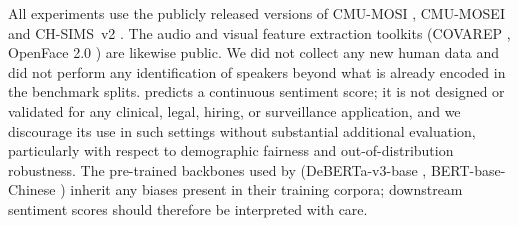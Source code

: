 All experiments use the publicly released versions of \textsc{CMU-MOSI}
\citep{zadeh2016mosi}, \textsc{CMU-MOSEI} \citep{zadeh2018mosei} and
\textsc{CH-SIMS}~v2 \citep{liu2022simsv2}.
The audio and visual feature extraction toolkits (COVAREP
\citep{degottex2014covarep}, OpenFace 2.0
\citep{baltrusaitis2018openface}) are likewise public.
We did not collect any new human data and did not perform any
identification of speakers beyond what is already encoded in the
benchmark splits.
\methodname{} predicts a continuous sentiment score; it is not designed
or validated for any clinical, legal, hiring, or surveillance
application, and we discourage its use in such settings without
substantial additional evaluation, particularly with respect to
demographic fairness and out-of-distribution robustness.
The pre-trained backbones used by \methodname{}
(DeBERTa-v3-base \citep{he2023debertav3}, BERT-base-Chinese
\citep{devlin2019bert}) inherit any biases present in their training
corpora; downstream sentiment scores should therefore be interpreted
with care.
